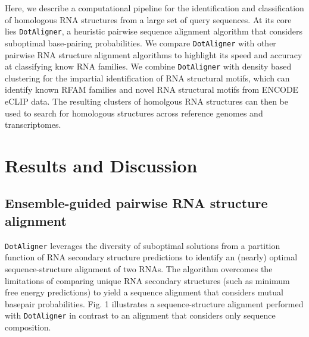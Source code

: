 \documentclass{bmcart}
\newcommand\dotaligner{\texttt{DotAligner}}
\newcommand\graphclust{\texttt{GraphClust}}
\newcommand\locarna{\texttt{LocaRNA}}
\newcommand\carna{\texttt{CARNA}}
\begin{document}


Here, we describe a computational pipeline for the identification and classification of
homologous RNA structures from a large set of query sequences. At its core lies \dotaligner{}, a
heuristic pairwise sequence alignment algorithm that considers suboptimal 
base-pairing probabilities. We compare \dotaligner{} with other pairwise RNA structure 
alignment algorithms to highlight its speed and accuracy at classifying know RNA families. 
We combine \dotaligner{} with density based clustering for the impartial identification of 
RNA structural motifs, which can identify known RFAM families and novel RNA structural 
motifs from ENCODE eCLIP data. The resulting clusters of homolgous RNA structures can then 
be used to search for homologous structures across reference genomes and transcriptomes.  

\section*{Results and Discussion}
\subsection*{Ensemble-guided pairwise RNA structure alignment} 
 
\dotaligner{} leverages the diversity of  suboptimal solutions from a partition
function of RNA secondary structure predictions to identify an (nearly) optimal
sequence-structure alignment of two RNAs.  The algorithm overcomes the
limitations of comparing unique RNA secondary structures (such as minimum free
energy predictions) to yield a sequence alignment that considers
mutual basepair probabilities. Fig. 1 illustrates a sequence-structure
alignment performed with \dotaligner{} in contrast to an alignment that
considers only sequence composition.\\
\end{document}
